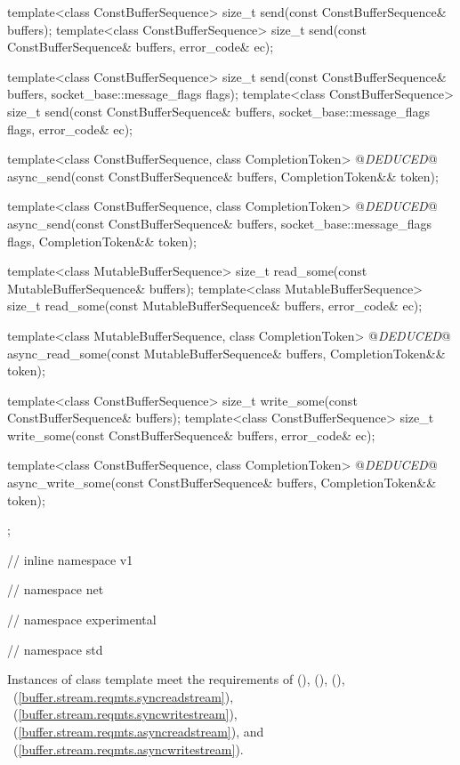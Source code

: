 \begin{codeblock}
{{{{{    template<class ConstBufferSequence>
      size_t send(const ConstBufferSequence& buffers);
    template<class ConstBufferSequence>
      size_t send(const ConstBufferSequence& buffers, error_code& ec);

    template<class ConstBufferSequence>
      size_t send(const ConstBufferSequence& buffers,
                  socket_base::message_flags flags);
    template<class ConstBufferSequence>
      size_t send(const ConstBufferSequence& buffers,
                  socket_base::message_flags flags, error_code& ec);

    template<class ConstBufferSequence, class CompletionToken>
      @\textit{DEDUCED}@ async_send(const ConstBufferSequence& buffers,
                         CompletionToken&& token);

    template<class ConstBufferSequence, class CompletionToken>
      @\textit{DEDUCED}@ async_send(const ConstBufferSequence& buffers,
                         socket_base::message_flags flags,
                         CompletionToken&& token);

    template<class MutableBufferSequence>
      size_t read_some(const MutableBufferSequence& buffers);
    template<class MutableBufferSequence>
      size_t read_some(const MutableBufferSequence& buffers,
                       error_code& ec);

    template<class MutableBufferSequence, class CompletionToken>
      @\textit{DEDUCED}@ async_read_some(const MutableBufferSequence& buffers,
                              CompletionToken&& token);

    template<class ConstBufferSequence>
      size_t write_some(const ConstBufferSequence& buffers);
    template<class ConstBufferSequence>
      size_t write_some(const ConstBufferSequence& buffers,
                        error_code& ec);

    template<class ConstBufferSequence, class CompletionToken>
      @\textit{DEDUCED}@ async_write_some(const ConstBufferSequence& buffers,
                               CompletionToken&& token);
  };

} // inline namespace v1
} // namespace net
} // namespace experimental
} // namespace std
\end{codeblock}

\pnum
Instances of class template  meet the requirements of  (),  (),  (), ~(\ref{buffer.stream.reqmts.syncreadstream}), ~(\ref{buffer.stream.reqmts.syncwritestream}), ~(\ref{buffer.stream.reqmts.asyncreadstream}), and ~(\ref{buffer.stream.reqmts.asyncwritestream}).

